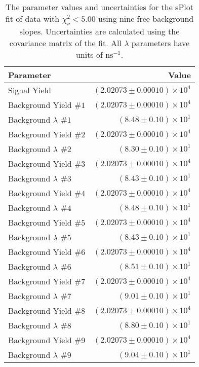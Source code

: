 
\begin{table}[h]
    \begin{center}
        \begin{tabular}{lr}\toprule
            Parameter & Value \\\midrule
            Signal Yield & $(2.02073 \pm 0.00010) \times 10^{4}$ \\
            Background Yield $\#1$ & $(2.02073 \pm 0.00010) \times 10^{4}$ \\
            Background $\lambda$ $\#1$ & $(8.48 \pm 0.10) \times 10^{1}$ \\
            Background Yield $\#2$ & $(2.02073 \pm 0.00010) \times 10^{4}$ \\
            Background $\lambda$ $\#2$ & $(8.30 \pm 0.10) \times 10^{1}$ \\
            Background Yield $\#3$ & $(2.02073 \pm 0.00010) \times 10^{4}$ \\
            Background $\lambda$ $\#3$ & $(8.43 \pm 0.10) \times 10^{1}$ \\
            Background Yield $\#4$ & $(2.02073 \pm 0.00010) \times 10^{4}$ \\
            Background $\lambda$ $\#4$ & $(8.48 \pm 0.10) \times 10^{1}$ \\
            Background Yield $\#5$ & $(2.02073 \pm 0.00010) \times 10^{4}$ \\
            Background $\lambda$ $\#5$ & $(8.43 \pm 0.10) \times 10^{1}$ \\
            Background Yield $\#6$ & $(2.02073 \pm 0.00010) \times 10^{4}$ \\
            Background $\lambda$ $\#6$ & $(8.51 \pm 0.10) \times 10^{1}$ \\
            Background Yield $\#7$ & $(2.02073 \pm 0.00010) \times 10^{4}$ \\
            Background $\lambda$ $\#7$ & $(9.01 \pm 0.10) \times 10^{1}$ \\
            Background Yield $\#8$ & $(2.02073 \pm 0.00010) \times 10^{4}$ \\
            Background $\lambda$ $\#8$ & $(8.80 \pm 0.10) \times 10^{1}$ \\
            Background Yield $\#9$ & $(2.02073 \pm 0.00010) \times 10^{4}$ \\
            Background $\lambda$ $\#9$ & $(9.04 \pm 0.10) \times 10^{1}$ \\\bottomrule
        \end{tabular}
        \caption{The parameter values and uncertainties for the sPlot fit of data with $\chi^2_\nu < 5.00$ using nine free background slopes. Uncertainties are calculated using the covariance matrix of the fit. All $\lambda$ parameters have units of $\si{\nano\second}^{-1}$.}
    \end{center}
\end{table}
